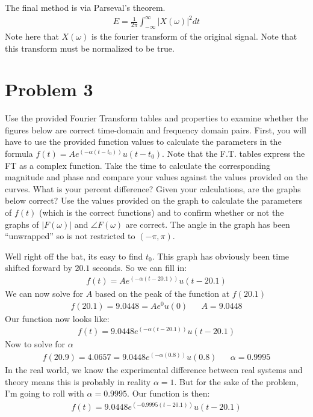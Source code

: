 \documentclass{article}
\begin{document}
The final method is via Parseval's theorem.
\begin{align*}
E = \frac{1}{2\pi} \int_{-\infty}^{\infty} |X(\omega )|^2 dt
\end{align*}
Note here that $X(\omega )$ is the fourier transform of the original signal. Note that this transform must be normalized to be true.
\pagebreak
\section*{Problem 3}
Use the provided Fourier Transform tables and properties to examine whether the figures below are correct time-domain and frequency domain pairs. First, you will have to use the provided function values to calculate the parameters in the formula $f(t)=A e^{(-\alpha(t-t_0) )} u(t-t_0)$. Note that the F.T. tables express the FT as a complex function. Take the time to calculate the corresponding magnitude and phase and compare your values against the values provided on the curves. What is your percent difference? Given your calculations, are the graphs below correct? Use the values provided on the graph to calculate the parameters of $f(t)$ (which is the correct functions) and to confirm whether or not the graphs of $|F(\omega)|$ and $\angle F(\omega )$ are correct. The angle in the graph has been “unwrapped” so is not restricted to $(-\pi,\pi)$.

Well right off the bat, its easy to find $t_0$. This graph has obviously been time shifted forward by $20.1$ seconds. So we can fill in:
\begin{align*}
f(t)=A e^{(-\alpha(t-20.1) )} u(t-20.1)
\end{align*}
We can now solve for $A$ based on the peak of the function at $f(20.1)$
\begin{align*}
f(20.1)= 9.0448 = A e^{0} u(0) && A=9.0448
\end{align*}
Our function now looks like:
\begin{align*}
f(t)=9.0448 e^{(-\alpha(t-20.1) )} u(t-20.1)
\end{align*}
Now to solve for $\alpha$
\begin{align*}
f(20.9)= 4.0657 = 9.0448 e^{(-\alpha(0.8) )} u(0.8) && \alpha = 0.9995
\end{align*}
In the real world, we know the experimental difference between real systems and theory means this is probably in reality $\alpha = 1$. But for the sake of the problem, I'm going to roll with $\alpha = 0.9995$. Our function is then:
\begin{align*}
f(t)=9.0448 e^{(-0.9995(t-20.1) )} u(t-20.1)
\end{align*}
\end{document}
